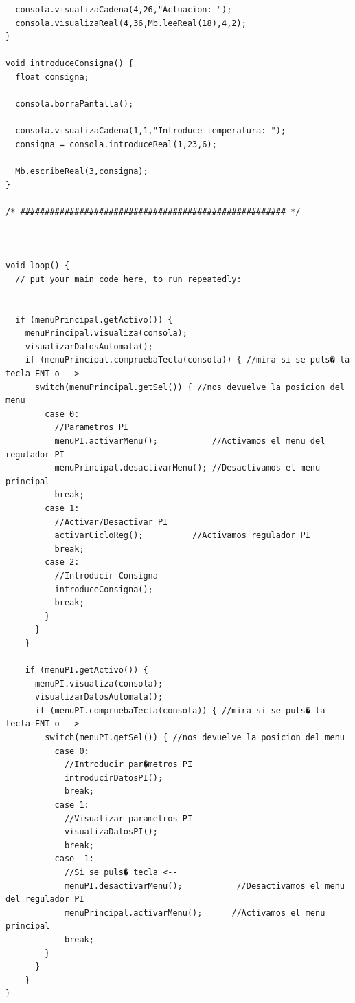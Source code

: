 \documentclass[11pt,twoside]{book}
\begin{document}
\begin{lstlisting}
  consola.visualizaCadena(4,26,"Actuacion: ");
  consola.visualizaReal(4,36,Mb.leeReal(18),4,2);
}

void introduceConsigna() {
  float consigna;

  consola.borraPantalla();

  consola.visualizaCadena(1,1,"Introduce temperatura: ");
  consigna = consola.introduceReal(1,23,6);

  Mb.escribeReal(3,consigna);
}

/* ###################################################### */



void loop() {
  // put your main code here, to run repeatedly:


  if (menuPrincipal.getActivo()) {
    menuPrincipal.visualiza(consola);
    visualizarDatosAutomata();
    if (menuPrincipal.compruebaTecla(consola)) { //mira si se puls� la tecla ENT o -->
      switch(menuPrincipal.getSel()) { //nos devuelve la posicion del menu
        case 0:
          //Parametros PI
          menuPI.activarMenu();           //Activamos el menu del regulador PI
          menuPrincipal.desactivarMenu(); //Desactivamos el menu principal
          break;
        case 1:
          //Activar/Desactivar PI
          activarCicloReg();          //Activamos regulador PI
          break;
        case 2:
          //Introducir Consigna
          introduceConsigna();
          break;
        }
      }
    }

    if (menuPI.getActivo()) {
      menuPI.visualiza(consola);
      visualizarDatosAutomata();
      if (menuPI.compruebaTecla(consola)) { //mira si se puls� la tecla ENT o -->
        switch(menuPI.getSel()) { //nos devuelve la posicion del menu
          case 0:
            //Introducir par�metros PI
            introducirDatosPI();
            break;
          case 1:
            //Visualizar parametros PI
            visualizaDatosPI();
            break;
          case -1:
            //Si se puls� tecla <--
            menuPI.desactivarMenu();           //Desactivamos el menu del regulador PI
            menuPrincipal.activarMenu();      //Activamos el menu principal
            break;
        }
      }
    }
}

\end{lstlisting}


\stopcontents[parts]

\cleardoublepage

\renewcommand{\documento}{ANEXOS}
\end{document}
